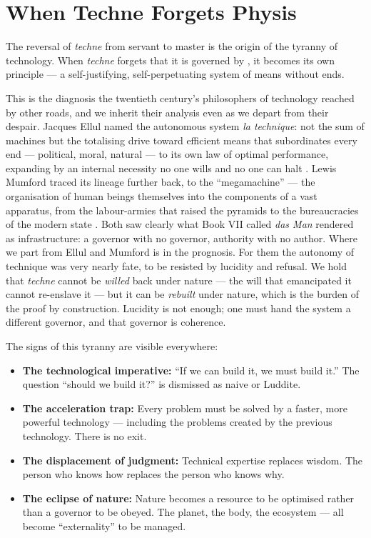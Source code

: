 \section{When Techne Forgets Physis}

The reversal of \emph{techne} from servant to master is the origin of the
tyranny of technology. When \emph{techne} forgets that it is governed by
\physis, it becomes its own principle --- a self-justifying, self-perpetuating
system of means without ends.

This is the diagnosis the twentieth century's philosophers of technology reached
by other roads, and we inherit their analysis even as we depart from their
despair. Jacques Ellul named the autonomous system \emph{la technique}: not the
sum of machines but the totalising drive toward efficient means that
subordinates every end --- political, moral, natural --- to its own law of optimal
performance, expanding by an internal necessity no one wills and no one can halt
\parencite{ellul1964technological}. Lewis Mumford traced its lineage further back,
to the ``megamachine'' --- the organisation of human beings themselves into the
components of a vast apparatus, from the labour-armies that raised the pyramids to
the bureaucracies of the modern state \parencite{mumford1934technics}. Both saw
clearly what Book VII called \emph{das Man} rendered as infrastructure: a governor
with no governor, authority with no author. Where we part from Ellul and Mumford
is in the prognosis. For them the autonomy of technique was very nearly fate, to
be resisted by lucidity and refusal. We hold that \emph{techne} cannot be
\emph{willed} back under nature --- the will that emancipated it cannot re-enslave
it --- but it can be \emph{rebuilt} under nature, which is the burden of the proof
by construction. Lucidity is not enough; one must hand the system a different
governor, and that governor is coherence.

The signs of this tyranny are visible everywhere:

\begin{itemize}
\item \textbf{The technological imperative:} ``If we can build it, we must build
  it.'' The question ``should we build it?'' is dismissed as naive or Luddite.
\item \textbf{The acceleration trap:} Every problem must be solved by a faster,
  more powerful technology --- including the problems created by the previous
  technology. There is no exit.
\item \textbf{The displacement of judgment:} Technical expertise replaces wisdom.
  The person who knows how replaces the person who knows why.
\item \textbf{The eclipse of nature:} Nature becomes a resource to be optimised
  rather than a governor to be obeyed. The planet, the body, the ecosystem ---
  all become ``externality'' to be managed.
\end{itemize}

